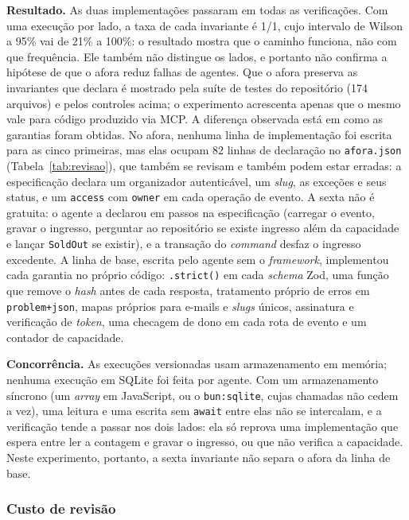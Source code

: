 \documentclass[a4paper,12pt]{article}
\newcommand{\estr}[1]{\textit{#1}}
\begin{document}
\textbf{Resultado.} As duas implementações passaram em todas as verificações. Com uma execução por lado, a taxa de cada invariante é 1/1, cujo intervalo de Wilson a 95\% vai de 21\% a 100\%: o resultado mostra que o caminho funciona, não com que frequência. Ele também não distingue os lados, e portanto não confirma a hipótese de que o afora reduz falhas de agentes. Que o afora preserva as invariantes que declara é mostrado pela suíte de testes do repositório (174 arquivos) e pelos controles acima; o experimento acrescenta apenas que o mesmo vale para código produzido via MCP. A diferença observada está em como as garantias foram obtidas. No afora, nenhuma linha de implementação foi escrita para as cinco primeiras, mas elas ocupam 82 linhas de declaração no \texttt{afora.json} (Tabela~\ref{tab:revisao}), que também se revisam e também podem estar erradas: a especificação declara um organizador autenticável, um \estr{slug}, as exceções e seus status, e um \texttt{access} com \texttt{owner} em cada operação de evento. A sexta não é gratuita: o agente a declarou em passos na especificação (carregar o evento, gravar o ingresso, perguntar ao repositório se existe ingresso além da capacidade e lançar \texttt{SoldOut} se existir), e a transação do \estr{command} desfaz o ingresso excedente. A linha de base, escrita pelo agente sem o \estr{framework}, implementou cada garantia no próprio código: \texttt{.strict()} em cada \estr{schema} Zod, uma função que remove o \estr{hash} antes de cada resposta, tratamento próprio de erros em \texttt{problem+json}, mapas próprios para e-mails e \estr{slugs} únicos, assinatura e verificação de \estr{token}, uma checagem de dono em cada rota de evento e um contador de capacidade.

\textbf{Concorrência.} As execuções versionadas usam armazenamento em memória; nenhuma execução em SQLite foi feita por agente. Com um armazenamento síncrono (um \estr{array} em JavaScript, ou o \texttt{bun:sqlite}, cujas chamadas não cedem a vez), uma leitura e uma escrita sem \texttt{await} entre elas não se intercalam, e a verificação tende a passar nos dois lados: ela só reprova uma implementação que espera entre ler a contagem e gravar o ingresso, ou que não verifica a capacidade. Neste experimento, portanto, a sexta invariante não separa o afora da linha de base.

\subsubsection{Custo de revisão}\label{sec:revisao}
\end{document}
